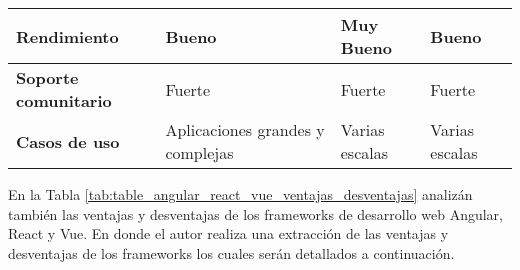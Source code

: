 \begin{spacing}{1}
\begin{center}
\begin{longtable}[c]{ |>{\bfseries}p{} |p{} |p{}  |p{}|  }
            \hline
            Rendimiento                                  & Bueno                                & Muy Bueno                           & Bueno                             \\
            \hline
            Soporte comunitario                          & Fuerte                               & Fuerte                              & Fuerte                            \\
            \hline
            Casos de uso                                 & Aplicaciones grandes y complejas     & Varias escalas                      & Varias escalas                    \\
            \hline
        \end{longtable}\label{tab:table_angular_react_vue_caracteristicas}

    \end{center}
\end{spacing}

En la Tabla \ref{tab:table_angular_react_vue_ventajas_desventajas} analizán también las ventajas y desventajas de los frameworks de desarrollo web Angular, React y Vue.
En donde el autor \cite{universitat_politecnica_de_valencia_universitat_2014}  realiza una extracción de las ventajas y desventajas de los frameworks los cuales serán detallados a continuación.

